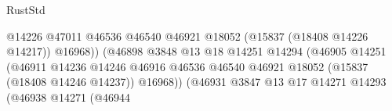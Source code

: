 \begin{lexlean}{RustStd}
\begin{coremodule}
                                                                  @14226
                                                                  @47011
                                                                  @46536
                                                                  @46540
                                                                  @46921
                                                                  @18052
                                                                  (@15837 (@18408 @14226 @14217))
                                                                  @16968))
                                                              (@46898
                                                                @3848
                                                                @13
                                                                @18
                                                                @14251
                                                                @14294
                                                                (@46905
                                                                  @14251
                                                                  (@46911
                                                                    @14236
                                                                    @14246
                                                                    @46916
                                                                    @46536
                                                                    @46540
                                                                    @46921
                                                                    @18052
                                                                    (@15837 (@18408 @14246 @14237))
                                                                    @16968))
                                                                (@46931
                                                                  @3847
                                                                  @13
                                                                  @17
                                                                  @14271
                                                                  @14293
                                                                  (@46938
                                                                    @14271
                                                                    (@46944

\end{coremodule}
\end{lexlean}
